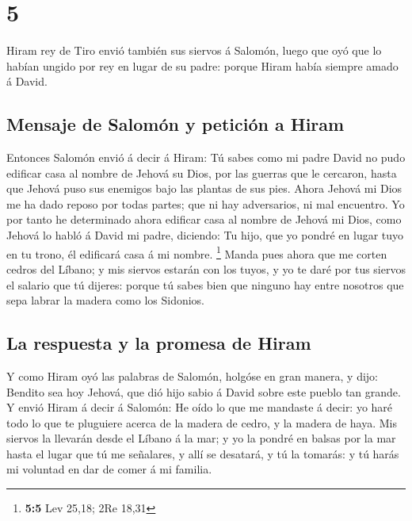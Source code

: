 \hypertarget{section-4}{%
\section{5}\label{section-4}}

 Hiram rey de Tiro envió también sus siervos á Salomón,
luego que oyó que lo habían ungido por rey en lugar de su padre: porque
Hiram había siempre amado á David.

\hypertarget{mensaje-de-salomuxf3n-y-peticiuxf3n-a-hiram}{%
\subsection{Mensaje de Salomón y petición a
Hiram}\label{mensaje-de-salomuxf3n-y-peticiuxf3n-a-hiram}}

 Entonces Salomón envió á decir á Hiram:  Tú
sabes como mi padre David no pudo edificar casa al nombre de Jehová su
Dios, por las guerras que le cercaron, hasta que Jehová puso sus
enemigos bajo las plantas de sus pies.  Ahora Jehová mi
Dios me ha dado reposo por todas partes; que ni hay adversarios, ni mal
encuentro.  Yo por tanto he determinado ahora edificar
casa al nombre de Jehová mi Dios, como Jehová lo habló á David mi padre,
diciendo: Tu hijo, que yo pondré en lugar tuyo en tu trono, él edificará
casa á mi nombre. \footnote{\textbf{5:5} Lev 25,18; 2Re 18,31}
 Manda pues ahora que me corten cedros del Líbano; y mis
siervos estarán con los tuyos, y yo te daré por tus siervos el salario
que tú dijeres: porque tú sabes bien que ninguno hay entre nosotros que
sepa labrar la madera como los Sidonios.

\hypertarget{la-respuesta-y-la-promesa-de-hiram}{%
\subsection{La respuesta y la promesa de
Hiram}\label{la-respuesta-y-la-promesa-de-hiram}}

 Y como Hiram oyó las palabras de Salomón, holgóse en gran
manera, y dijo: Bendito sea hoy Jehová, que dió hijo sabio á David sobre
este pueblo tan grande.  Y envió Hiram á decir á Salomón:
He oído lo que me mandaste á decir: yo haré todo lo que te pluguiere
acerca de la madera de cedro, y la madera de haya.  Mis
siervos la llevarán desde el Líbano á la mar; y yo la pondré en balsas
por la mar hasta el lugar que tú me señalares, y allí se desatará, y tú
la tomarás: y tú harás mi voluntad en dar de comer á mi familia.

